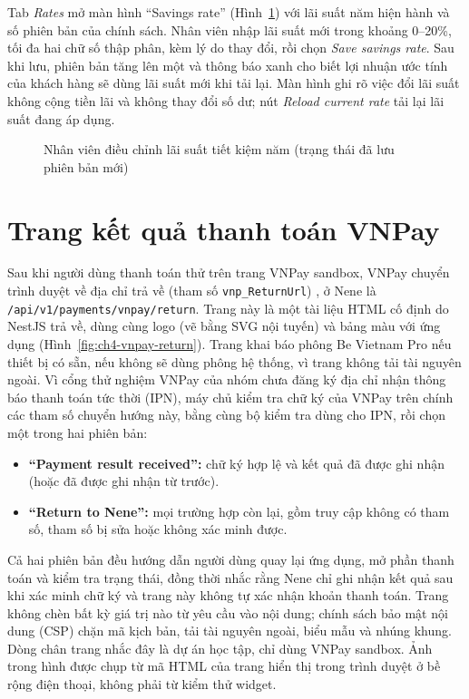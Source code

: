 Tab \textit{Rates} mở màn hình ``Savings rate'' (Hình~\ref{fig:ch4-savings-rate}) với lãi suất năm hiện hành và số phiên bản của chính sách. Nhân viên nhập lãi suất mới trong khoảng 0--20\%, tối đa hai chữ số thập phân, kèm lý do thay đổi, rồi chọn \textit{Save savings rate}. Sau khi lưu, phiên bản tăng lên một và thông báo xanh cho biết lợi nhuận ước tính của khách hàng sẽ dùng lãi suất mới khi tải lại. Màn hình ghi rõ việc đổi lãi suất không cộng tiền lãi và không thay đổi số dư; nút \textit{Reload current rate} tải lại lãi suất đang áp dụng.

\begin{figure}[H]
\centering
{}
\caption{Nhân viên điều chỉnh lãi suất tiết kiệm năm (trạng thái đã lưu phiên bản mới)}
\label{fig:ch4-savings-rate}
\end{figure}

\section{Trang kết quả thanh toán VNPay}
\label{sec:ch4-vnpay-return}

Sau khi người dùng thanh toán thử trên trang VNPay sandbox, VNPay chuyển trình duyệt về địa chỉ trả về (tham số \texttt{vnp\_\allowbreak{}ReturnUrl}) \parencite{ch2-vnpay-pay}, ở Nene là \texttt{/\allowbreak{}api/\allowbreak{}v1/\allowbreak{}payments/\allowbreak{}vnpay/\allowbreak{}return}. Trang này là một tài liệu HTML cố định do NestJS trả về, dùng cùng logo (vẽ bằng SVG nội tuyến) và bảng màu với ứng dụng (Hình~\ref{fig:ch4-vnpay-return}). Trang khai báo phông Be Vietnam Pro nếu thiết bị có sẵn, nếu không sẽ dùng phông hệ thống, vì trang không tải tài nguyên ngoài. Vì cổng thử nghiệm VNPay của nhóm chưa đăng ký địa chỉ nhận thông báo thanh toán tức thời (IPN), máy chủ kiểm tra chữ ký của VNPay trên chính các tham số chuyển hướng này, bằng cùng bộ kiểm tra dùng cho IPN, rồi chọn một trong hai phiên bản:
\begin{itemize}
  \item \textbf{``Payment result received'':} chữ ký hợp lệ và kết quả đã được ghi nhận (hoặc đã được ghi nhận từ trước).
  \item \textbf{``Return to Nene'':} mọi trường hợp còn lại, gồm truy cập không có tham số, tham số bị sửa hoặc không xác minh được.
\end{itemize}
Cả hai phiên bản đều hướng dẫn người dùng quay lại ứng dụng, mở phần thanh toán và kiểm tra trạng thái, đồng thời nhắc rằng Nene chỉ ghi nhận kết quả sau khi xác minh chữ ký và trang này không tự xác nhận khoản thanh toán. Trang không chèn bất kỳ giá trị nào từ yêu cầu vào nội dung; chính sách bảo mật nội dung (CSP) chặn mã kịch bản, tải tài nguyên ngoài, biểu mẫu và nhúng khung. Dòng chân trang nhắc đây là dự án học tập, chỉ dùng VNPay sandbox. Ảnh trong hình được chụp từ mã HTML của trang hiển thị trong trình duyệt ở bề rộng điện thoại, không phải từ kiểm thử widget.

